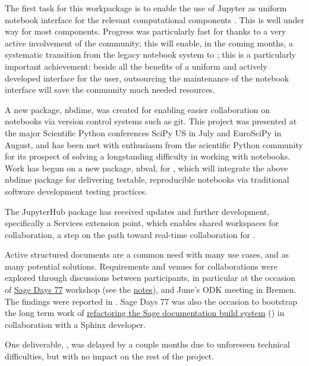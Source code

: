 \documentclass{deliverablereport}
\begin{document}
The first task for this workpackage is to enable the use of Jupyter as
uniform notebook interface for the relevant computational components
. This is well under way for most
components. Progress was particularly fast for \Sage thanks to a very
active involvement of the community; this will enable, in the coming
months, a systematic transition from the legacy \Sage notebook system
to \Jupyter; this is a particularly important achievement: beside all
the benefits of a uniform and actively developed interface for the
user, outsourcing the maintenance of the notebook interface will save
the \Sage community much needed resources.

A new \Jupyter package, nbdime, was created for
 enabling easier collaboration on
notebooks via version control systems such as git.  This project was
presented at the major Scientific Python conferences SciPy US in July and EuroSciPy in August, and has been
met with enthusiasm from the scientific Python community for its
prospect of solving a longstanding difficulty in working with
notebooks.  Work has begun on a new package, nbval, for
, which will integrate the above nbdime
package for delivering testable, reproducible notebooks via
traditional software development testing practices.

The JupyterHub package has received updates and further development,
specifically a Services extension point, which enables shared
workspaces for collaboration, a step on the path toward real-time
collaboration for .

Active structured documents are a common need with many use cases, and
as many potential solutions. Requirements and venues for
collaborations were explored through discussions between participants,
in particular at the occasion of
\href{https://wiki.sagemath.org/days77/}{Sage Days 77} workshop (see
the
\href{https://wiki.sagemath.org/days77/live-structured-documents}{notes}),
and June's ODK meeting in Bremen. The findings were reported in
. Sage Days 77 was also the occasion to bootstrap
the long term work of
\href{https://wiki.sagemath.org/days77/documentation}{refactoring the
  Sage documentation build system} () in
collaboration with a Sphinx developer.

One deliverable, , was delayed by a
couple months due to unforeseen technical difficulties, but with no
impact on the rest of the project.
\end{document}
